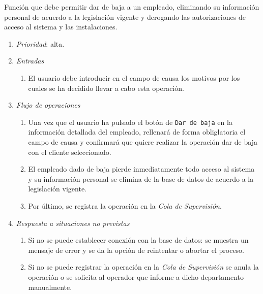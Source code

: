 	Función que debe permitir dar de baja a un empleado, eliminando su información personal de acuerdo a la legislación vigente y derogando las autorizaciones de acceso al sistema y las instalaciones.
							
	\begin{enumerate}
		\item \textit{Prioridad}: alta.
		\item \textit{Entradas}
			\begin{enumerate}
				\item El usuario debe introducir en el campo de causa los motivos por los cuales se ha decidido llevar a cabo esta operación.
			\end{enumerate}
		\item \textit{Flujo de operaciones}
			\begin{enumerate}
				\item Una vez que el usuario ha pulsado el botón de \verb|Dar de baja| en la información detallada del empleado, rellenará de forma obliglatoria el campo de causa y confirmará que quiere realizar la operación dar de baja con el cliente seleccionado.
				\item El empleado dado de baja pierde inmediatamente todo acceso al sistema y su información personal se elimina de la base de datos de acuerdo a la legislación vigente.
				\item Por último, se registra la operación en la \textit{Cola de Supervisión}.
			\end{enumerate}
		\item \textit{Respuesta a situaciones no previstas}
			\begin{enumerate}
				\item Si no se puede establecer conexión con la base de datos: se muestra un mensaje de error y se da la opción de reintentar o abortar el proceso.
				\item Si no se puede registrar  la operación en la \textit{Cola de Supervisión} se anula la operación o se solicita al operador que informe a dicho departamento manualmente.
			\end{enumerate}
	\end{enumerate}
								
